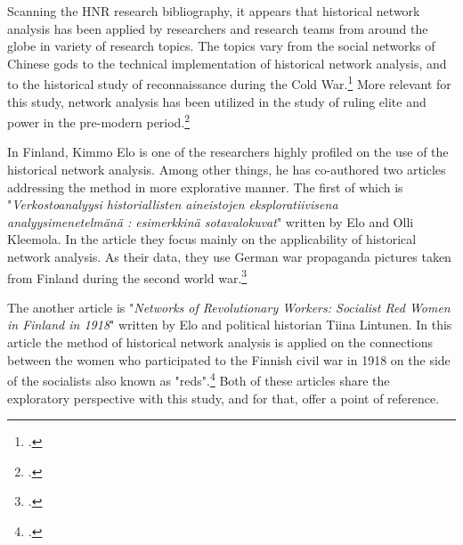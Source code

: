 \documentclass[a4paper,12pt]{article}
\begin{document}
\begin{onehalfspace}
Scanning the HNR research bibliography, it appears that historical network analysis has been applied by researchers and research teams from around the globe in variety of research topics. The topics vary from the social networks of Chinese gods to the technical implementation of historical network analysis, and to the historical study of reconnaissance during the Cold War.\footcites[p. 22.]{elo16}{hnrbib} More relevant for this study, network analysis has been utilized in the study of ruling elite and power in the pre-modern period.\footcite[See e. g. Ruth Ahnert's and Sebastian E. Ahnert's book \textit{Tudor Networks of Power} (2023) or Paul D Mclean's article \textit{Widening Access While Tightening Control: Office-Holding, Marriages, and Elite Consolidation in Early Modern Poland} (2004).]{JonVidarEt} 
 
In Finland, Kimmo Elo is one of the researchers highly profiled on the use of the historical network analysis. Among other things, he has co-authored two articles addressing the method in more explorative manner. The first of which is "\textit{Verkostoanalyysi historiallisten aineistojen eksploratiivisena analyysimenetelmänä : esimerkkinä sotavalokuvat}" written by Elo and Olli Kleemola. In the article they focus mainly on the applicability of historical network analysis. As their data, they use German war propaganda pictures taken from Finland during the second world war.\footcite{eloAklee15}

The another article is "\textit{Networks of Revolutionary Workers: Socialist Red Women in Finland in 1918}" written by Elo and political historian Tiina Lintunen. In this article the method of historical network analysis is applied on the connections between the women who participated to the Finnish civil war in 1918 on the side of the socialists also known as "reds".\footcite[Almost the same article is found in Finnish in the \textit{Historiallinen Aikakauskirja} 116 (2/2018).]{LintunenAndElo2019} Both of these articles share the exploratory perspective with this study, and for that, offer a point of reference. 


\end{onehalfspace}
\end{document}
